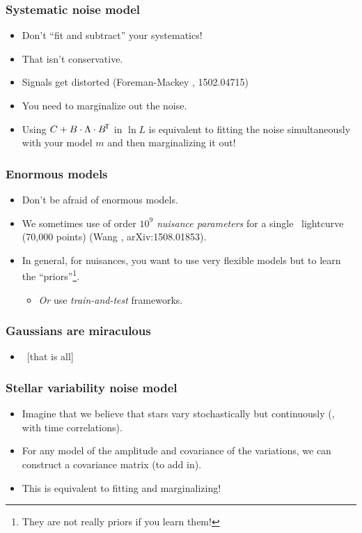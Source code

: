 \documentclass[pdftex]{beamer}
\begin{document}
\begin{frame}
  \frametitle{Systematic noise model}
  \begin{itemize}
  \item Don't ``fit and subtract'' your systematics!
  \item That isn't conservative.
  \item Signals get distorted {\footnotesize (Foreman-Mackey \etal, 1502.04715)}
  \item You need to marginalize out the noise.
  \item Using $C + B\cdot\Lambda\cdot{B}^{\mathsf{\!T}}$ in $\ln L$ is
    equivalent to fitting the noise simultaneously with your model $m$
    and then marginalizing it out!
  \end{itemize}
\end{frame}

\begin{frame}
  \frametitle{Enormous models}
  \begin{itemize}
  \item Don't be afraid of enormous models.
  \item We sometimes use of order \emph{$10^9$ nuisance parameters} for a
    single \kepler\ lightcurve (70,000 points) {\footnotesize (Wang
      \etal, arXiv:1508.01853)}.
  \item In general, for nuisances, you want to use very flexible
    models but to learn the ``priors''\footnote{They are not really
      priors if you learn them!}.
    \begin{itemize}
    \item \emph{Or} use \emph{train-and-test} frameworks.
    \end{itemize}
  \end{itemize}
\end{frame}

\begin{frame}
  \frametitle{Gaussians are miraculous}
  \begin{itemize}
  \item ~[that is all]
  \end{itemize}
\end{frame}

\begin{frame}
  \frametitle{Stellar variability noise model}
  \begin{itemize}
  \item Imagine that we believe that stars vary stochastically but
    continuously (\ie, with time correlations).
  \item For any model of the amplitude and covariance of the
    variations, we can construct a covariance matrix (to add in).
  \item This is equivalent to fitting and marginalizing!
  \end{itemize}
\end{frame}
\end{document}
